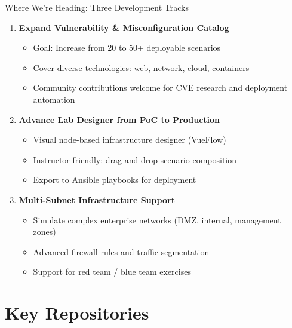 \documentclass[aspectratio=169]{beamer}
\begin{document}
\begin{frame}{Where We're Heading: Three Development Tracks \; \faRoad}
  \begin{enumerate}
    \item \textbf{Expand Vulnerability \& Misconfiguration Catalog}
    \begin{itemize}
      \item Goal: Increase from 20 to 50+ deployable scenarios
      \item Cover diverse technologies: web, network, cloud, containers
      \item Community contributions welcome for CVE research and deployment automation
    \end{itemize}
    
    \item \textbf{Advance Lab Designer from PoC to Production}
    \begin{itemize}
      \item Visual node-based infrastructure designer (VueFlow)
      \item Instructor-friendly: drag-and-drop scenario composition
      \item Export to Ansible playbooks for deployment
    \end{itemize}
    
    \item \textbf{Multi-Subnet Infrastructure Support}
    \begin{itemize}
      \item Simulate complex enterprise networks (DMZ, internal, management zones)
      \item Advanced firewall rules and traffic segmentation
      \item Support for red team / blue team exercises
    \end{itemize}
  \end{enumerate}
\end{frame}

\section{Key Repositories}
\end{document}
